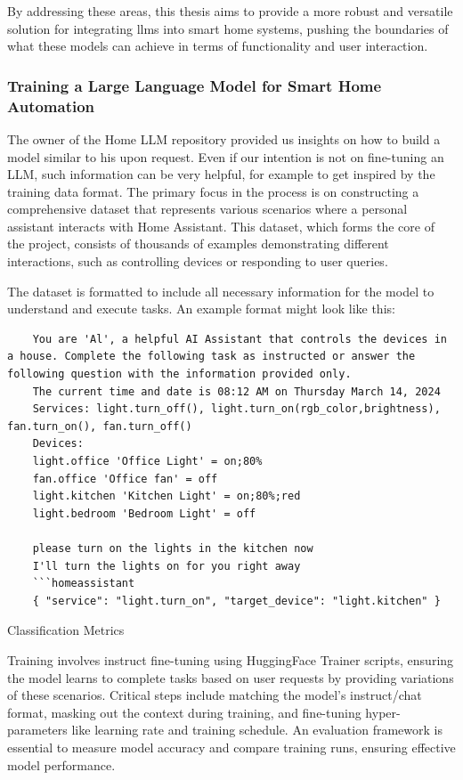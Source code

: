By addressing these areas, this thesis aims to provide a more robust and versatile solution for integrating \glspl{llm} into smart home systems, pushing the boundaries of what these models can achieve in terms of functionality and user interaction.

\subsubsection{Training a Large Language Model for Smart Home Automation}
The owner of the Home LLM repository provided us insights on how to build a model similar to his upon request.
Even if our intention is not on fine-tuning an LLM, such information can be very helpful, for example to get inspired by the training data format. 
The primary focus in the process is on constructing a comprehensive dataset that represents various scenarios where a personal assistant interacts with Home Assistant. This dataset, which forms the core of the project, consists of thousands of examples demonstrating different interactions, such as controlling devices or responding to user queries.

The dataset is formatted to include all necessary information for the model to understand and execute tasks. An example format might look like this:

\begin{Listing}[h]
  \begin{lstlisting}
    You are 'Al', a helpful AI Assistant that controls the devices in a house. Complete the following task as instructed or answer the following question with the information provided only.
    The current time and date is 08:12 AM on Thursday March 14, 2024
    Services: light.turn_off(), light.turn_on(rgb_color,brightness), fan.turn_on(), fan.turn_off()
    Devices:
    light.office 'Office Light' = on;80%
    fan.office 'Office fan' = off
    light.kitchen 'Kitchen Light' = on;80%;red
    light.bedroom 'Bedroom Light' = off
    
    please turn on the lights in the kitchen now
    I'll turn the lights on for you right away
    ```homeassistant
    { "service": "light.turn_on", "target_device": "light.kitchen" }
  \end{lstlisting}
  \caption{Classification Metrics}
  \label{lst:homeLLM}
\end{Listing}

Training involves instruct fine-tuning using HuggingFace Trainer scripts, ensuring the model learns to complete tasks based on user requests by providing variations of these scenarios. Critical steps include matching the model's instruct/chat format, masking out the context during training, and fine-tuning hyper-parameters like learning rate and training schedule.
An evaluation framework is essential to measure model accuracy and compare training runs, ensuring effective model performance.


